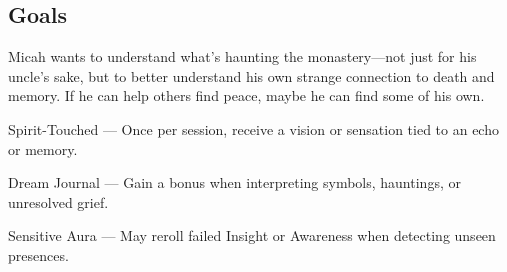 \documentclass[nodeprecatedcode,bg=print]{dndbook/dndbook}
\begin{document}
\begin{WyrdCharacterSheet}
    \subsection{Goals}
    Micah wants to understand what’s haunting the monastery—not just for his uncle’s sake, but to better understand his own strange connection to death and memory. If he can help others find peace, maybe he can find some of his own.
  
    \begin{WyrdStatsBlock}[profile=img/characters/micah_rios]
        \SkillsBox[%
            expert={Empathy},%
            skilled={Insight, Lore},%
            novice={Will, Fight, Persuasion},%
        ]
  
        \begin{TraitsBox}
            \item[Spirit-Touched] — Once per session, receive a vision or sensation tied to an echo or memory.
            \item[Dream Journal] — Gain a bonus when interpreting symbols, hauntings, or unresolved grief.
            \item[Sensitive Aura] — May reroll failed Insight or Awareness when detecting unseen presences.
        \end{TraitsBox}
  
        \DamageBox[%
        ]
    \end{WyrdStatsBlock}
\end{WyrdCharacterSheet}
  
\end{document}

